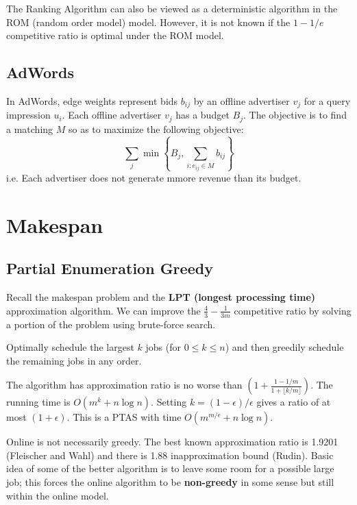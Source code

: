 The Ranking Algorithm can also be viewed as a deterministic algorithm in the ROM (random order model) model. However, it is not known if the $1-1/e$ competitive ratio is optimal under the ROM model.

\subsection{AdWords}

In AdWords, edge weights represent bids $b_{ij}$ by an offline advertiser $v_j$ for a query impression $u_i$. Each offline advertiser $v_j$ has a budget $B_j$. The objective is to find a matching $M$ so as to maximize the following objective:
$$
\sum_{j} \min \left\{B_j, \sum_{i:e_{ij} \in M} b_{ij}\right\}
$$
i.e. Each advertiser does not generate mmore revenue than its budget.

\section{Makespan}

\subsection{Partial Enumeration Greedy}

Recall the makespan problem and the \textbf{LPT (longest processing time)} approximation algorithm. We can improve the $\frac{4}{3} - \frac{1}{3m}$ competitive ratio by solving a portion of the problem using brute-force search.

\begin{definition}
    Optimally schedule the largest $k$ jobs (for $0 \leq k \leq n$) and then greedily schedule the remaining jobs in any order.
\end{definition}

The algorithm has approximation ratio is no worse than $(1 + \frac{1-1/m}{1 + \lfloor k/m \rfloor})$. The running time is $O(m^k + n \log n)$. Setting $k = (1-\epsilon)/\epsilon$ gives a ratio of at most $(1+\epsilon)$. This is a PTAS with time $O(m^{m/\epsilon} + n\log n)$.

Online is not necessarily greedy. The best known approximation ratio is 1.9201 (Fleischer and Wahl) and there is 1.88 inapproximation bound (Rudin). Basic idea of some of the better algorithm is to leave some room for a possible large job; this forces the online algorithm to be \textbf{non-greedy} in some sense but still within the online model.

